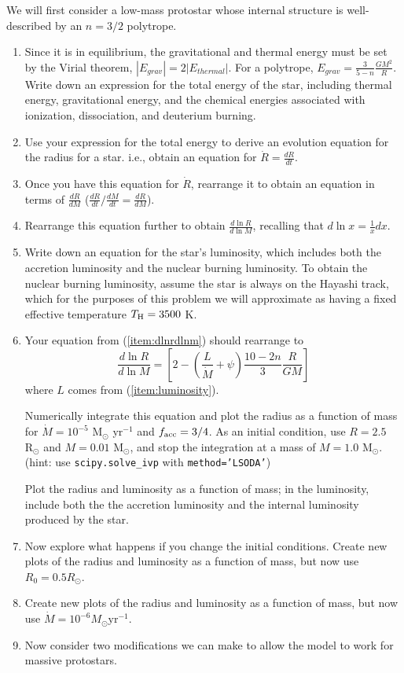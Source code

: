 \documentclass{article}
\newcommand{\msun}{\ensuremath{\mathrm{M}_\odot}\xspace}
\newcommand{\rsun}{\ensuremath{\mathrm{R}_\odot}\xspace}
\begin{document}
\begin{enumerate}
 We will first consider a low-mass protostar whose internal structure is
 well-described by an $n=3/2$ polytrope.


\begin{enumerate}
    \item 
 Since it is in equilibrium, the gravitational and thermal energy
 must be set by the Virial theorem, $|E_{grav}| =2 |E_{thermal}|$.
 For a polytrope, $E_{grav} = \frac{3}{5-n} \frac{G M^2}{R}$.
 Write down an expression for the total energy of the star,
 including thermal energy, gravitational energy, and the chemical energies
 associated with ionization, dissociation, and deuterium burning.
\item Use your expression for the total energy to derive an evolution equation
    for the radius for a star.  i.e., obtain an equation for $\dot{R}=\frac{dR}{dt}$.
\item Once you have this equation for $\dot{R}$, rearrange it to obtain an equation in terms
    of $\frac{dR}{dM}$ ($\frac{dR}{dt} / \frac{dM}{dt} = \frac{dR}{dM}$).
\item
    \label{item:dlnrdlnm}
    Rearrange this equation further to obtain $\frac{d \ln R}{d \ln M}$,
    recalling that $d \ln x = \frac{1}{x}dx$.
\item
    \label{item:luminosity}
    Write down an equation for the star's luminosity, which includes both the accretion 
    luminosity and the nuclear burning luminosity. 
    To obtain the nuclear burning luminosity,  assume the star is always on the Hayashi track,
    which for the purposes of this problem we will approximate as having a
    fixed effective temperature $T_{\rm H} = 3500$ K.
\item 
    Your equation from (\ref{item:dlnrdlnm}) should rearrange to
\begin{equation}
    \frac{d \ln R}{d \ln M} = \left[2 - \left(\frac{L}{\dot{M}}+\psi\right)\frac{10-2n}{3}\frac{R}{GM} \right]
\end{equation}
where $L$ comes from (\ref{item:luminosity}).

    Numerically integrate this equation and plot the radius as a function of
    mass for $\dot{M} = 10^{-5}$ $\msun$ yr$^{-1}$ and $f_{\rm acc}=3/4$. As an
    initial condition, use $R=2.5$ $\rsun$ and $M=0.01$ $\msun$, and stop the
    integration at a mass of $M=1.0$ $\msun$.
    (hint: use \texttt{scipy.solve\_ivp} with \texttt{method='LSODA'})

    Plot the radius and luminosity as
    a function of mass; in the luminosity, include both the the accretion
    luminosity and the internal luminosity produced by the star.
\item Now explore what happens if you change the initial conditions.
    Create new plots of the radius and luminosity as a function of mass, but now
    use $R_0=0.5 R_\odot$. 
\item 
    Create new plots of the radius and luminosity as a function of mass, but now
    use $\dot{M}=10^{-6} M_\odot \mathrm{yr}^{-1}$. 
\item Now consider two modifications we can make to allow the model to work
for massive protostars.


\end{enumerate}
\end{enumerate}
\end{document}
